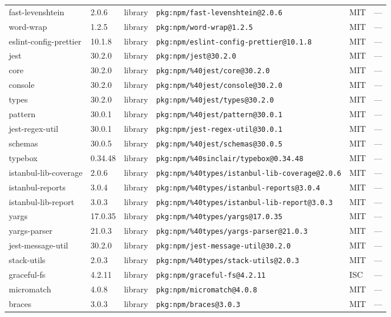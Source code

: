 \documentclass[11pt]{article}
\begin{document}
\begin{longtable}{|l|l|l|p{2.2cm}|l|p{4cm}|}
fast-levenshtein & 2.0.6 & library & \texttt{pkg:npm/fast-levenshtein@2.0.6} & MIT & — \\
word-wrap & 1.2.5 & library & \texttt{pkg:npm/word-wrap@1.2.5} & MIT & — \\
eslint-config-prettier & 10.1.8 & library & \texttt{pkg:npm/eslint-config-prettier@10.1.8} & MIT & — \\
jest & 30.2.0 & library & \texttt{pkg:npm/jest@30.2.0} & MIT & — \\
core & 30.2.0 & library & \texttt{pkg:npm/\%40jest/core@30.2.0} & MIT & — \\
console & 30.2.0 & library & \texttt{pkg:npm/\%40jest/console@30.2.0} & MIT & — \\
types & 30.2.0 & library & \texttt{pkg:npm/\%40jest/types@30.2.0} & MIT & — \\
pattern & 30.0.1 & library & \texttt{pkg:npm/\%40jest/pattern@30.0.1} & MIT & — \\
jest-regex-util & 30.0.1 & library & \texttt{pkg:npm/jest-regex-util@30.0.1} & MIT & — \\
schemas & 30.0.5 & library & \texttt{pkg:npm/\%40jest/schemas@30.0.5} & MIT & — \\
typebox & 0.34.48 & library & \texttt{pkg:npm/\%40sinclair/typebox@0.34.48} & MIT & — \\
istanbul-lib-coverage & 2.0.6 & library & \texttt{pkg:npm/\%40types/istanbul-lib-coverage@2.0.6} & MIT & — \\
istanbul-reports & 3.0.4 & library & \texttt{pkg:npm/\%40types/istanbul-reports@3.0.4} & MIT & — \\
istanbul-lib-report & 3.0.3 & library & \texttt{pkg:npm/\%40types/istanbul-lib-report@3.0.3} & MIT & — \\
yargs & 17.0.35 & library & \texttt{pkg:npm/\%40types/yargs@17.0.35} & MIT & — \\
yargs-parser & 21.0.3 & library & \texttt{pkg:npm/\%40types/yargs-parser@21.0.3} & MIT & — \\
jest-message-util & 30.2.0 & library & \texttt{pkg:npm/jest-message-util@30.2.0} & MIT & — \\
stack-utils & 2.0.3 & library & \texttt{pkg:npm/\%40types/stack-utils@2.0.3} & MIT & — \\
graceful-fs & 4.2.11 & library & \texttt{pkg:npm/graceful-fs@4.2.11} & ISC & — \\
micromatch & 4.0.8 & library & \texttt{pkg:npm/micromatch@4.0.8} & MIT & — \\
braces & 3.0.3 & library & \texttt{pkg:npm/braces@3.0.3} & MIT & — \\

\end{longtable}
\end{document}
